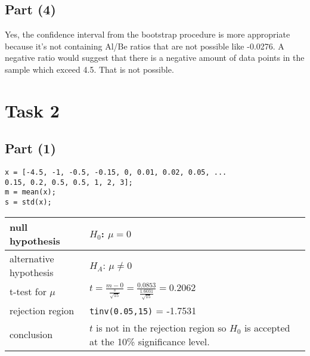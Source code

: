 \documentclass[british,a4paper,order=firstname]{mathscript}
\begin{document}
\subsection{Part (4)}
Yes, the confidence interval from the bootstrap procedure is more appropriate because it's not containing Al/Be ratios that are not possible like -0.0276. A negative ratio would suggest that there is a negative amount of data points in the sample which exceed 4.5. That is not possible. 

\pagebreak
\section{Task 2}
\subsection{Part (1)}
\begin{lstlisting}
x = [-4.5, -1, -0.5, -0.15, 0, 0.01, 0.02, 0.05, ...
0.15, 0.2, 0.5, 0.5, 1, 2, 3];
m = mean(x);
s = std(x);
\end{lstlisting}
\begin{center}
	\begin{tabular}{p{4cm}|p{7cm}}
		null hypothesis & $H_0$: $\mu = 0$ \\
		\hline
		alternative hypothesis & $H_A$: $\mu\neq 0$ \\
		\hline
		t-test for $\mu$ & $t=\frac{m-0}{\frac{s}{\sqrt{15}}} =\frac{0.0853}{\frac{1.6031}{\sqrt{15}}} = 0.2062$ \\
		\hline
		rejection region & \texttt{tinv(0.05,15)} = -1.7531 \\
		\hline
		conclusion & $t$ is not in the rejection region so $H_0$ is accepted at the 10\% significance level.
	\end{tabular}
\end{center}
\end{document}
